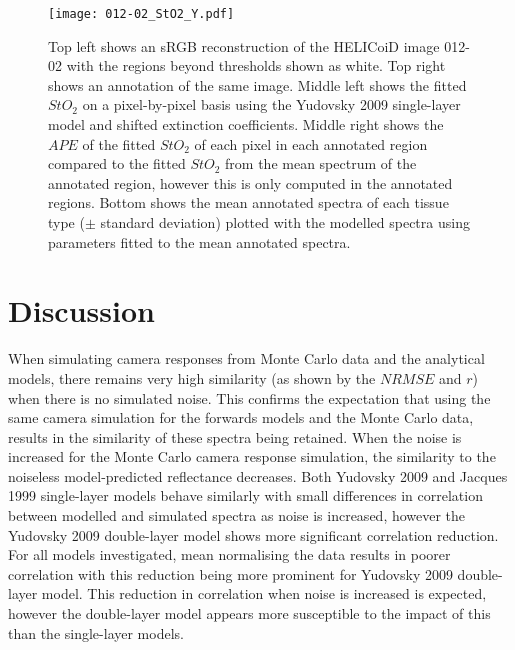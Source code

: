 \begin{figure}[h!]
    \centering 
    \texttt{[image: 012-02\_StO2\_Y.pdf]}
    \caption{Top left shows an sRGB reconstruction of the HELICoiD image 012-02 with the regions beyond thresholds shown as white. Top right shows an annotation of the same image. Middle left shows the fitted $StO_2$ on a pixel-by-pixel basis using the Yudovsky 2009 single-layer model and shifted extinction coefficients. Middle right shows the $APE$ of the fitted $StO_2$ of each pixel in each annotated region compared to the fitted $StO_2$ from the mean spectrum of the annotated region, however this is only computed in the annotated regions. Bottom shows the mean annotated spectra of each tissue type ($\pm$ standard deviation) plotted with the modelled spectra using parameters fitted to the mean annotated spectra.}
    \label{fig:HELICoiDpixelY}
\end{figure}

\FloatBarrier
\section{Discussion} \label{sec:discussion5}
When simulating camera responses from Monte Carlo data and the analytical models, there remains very high similarity (as shown by the $NRMSE$ and $r$) when there is no simulated noise. This confirms the expectation that using the same camera simulation for the forwards models and the Monte Carlo data, results in the similarity of these spectra being retained. When the noise is increased for the Monte Carlo camera response simulation, the similarity to the noiseless model-predicted reflectance decreases. Both Yudovsky 2009 and Jacques 1999 single-layer models behave similarly with small differences in correlation between modelled and simulated spectra as noise is increased, however the Yudovsky 2009 double-layer model shows more significant correlation reduction. For all models investigated, mean normalising the data results in poorer correlation with this reduction being more prominent for Yudovsky 2009 double-layer model. This reduction in correlation when noise is increased is expected, however the double-layer model appears more susceptible to the impact of this than the single-layer models. 


